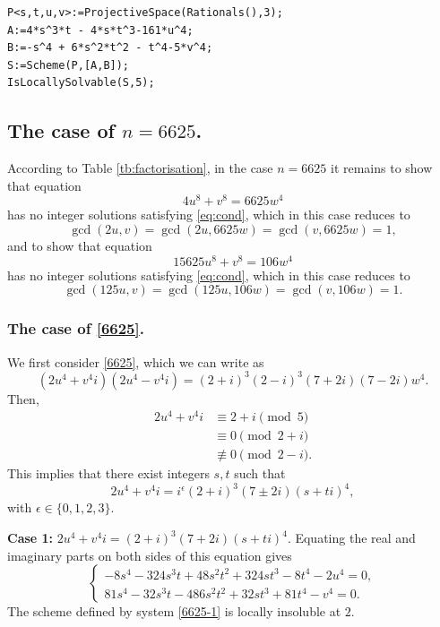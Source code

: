 \documentclass[a4paper,12pt,english,reqno]{amsart}
\begin{document}
\begin{lstlisting}
P<s,t,u,v>:=ProjectiveSpace(Rationals(),3);
A:=4*s^3*t - 4*s*t^3-161*u^4;
B:=-s^4 + 6*s^2*t^2 - t^4-5*v^4;
S:=Scheme(P,[A,B]);
IsLocallySolvable(S,5);
\end{lstlisting}


\subsection{The case of $n=6625$.}%
According to Table \ref{tb:factorisation}, in the case $n=6625$ it remains to
show that equation
\begin{equation}\label{6625}
4 u^8 + v^8 = 6625  w^4
\end{equation}
has no integer solutions satisfying \eqref{eq:cond}, which in this case reduces to \[\gcd(2u,v)=\gcd(2u,6625w)=\gcd(v,6625w)=1,\]
and to show that equation
\begin{equation}\label{6625.2}
15625 u^8 + v^8= 106  w^4
\end{equation}
has no integer solutions satisfying \eqref{eq:cond}, which in this case reduces to \[\gcd(125u,v)=\gcd(125u,106w)=\gcd(v,106w)=1.\]
 
 
 \subsubsection{\bf{The case of \eqref{6625}.}}
 We first consider \eqref{6625}, which we can write as
\begin{equation} (2u^4+v^4i)(2u^4-v^4i)=(2+i)^3(2-i)^3(7+2i)(7-2i)w^4.
\end{equation}
Then,
\[\begin{split}
    2u^4+v^4i&\equiv 2+i\pmod{5}\\
    &\equiv 0\pmod{2+i}\\
    &\not\equiv 0\pmod{2-i}.
\end{split}\]
This implies that there exist integers $s,t$ such that 
\[2u^4+v^4i=i^{\epsilon}(2+i)^3(7\pm 2i)(s+ti)^4,\]
with $\epsilon \in \{0,1,2,3\}$.

{\bf Case 1:} $2u^4+v^4i=(2+i)^3(7+2i)(s+ti)^4$. Equating the real and imaginary parts on both sides of this equation gives
\begin{equation}\label{6625-1}
\begin{cases}
-8s^4 - 324s^3t + 48s^2t^2 + 324st^3 - 8t^4 - 2u^4=0,\\
81s^4 - 32s^3t - 486s^2t^2 + 32st^3 + 81t^4 - v^4=0.
\end{cases}
\end{equation}
The scheme defined by system \eqref{6625-1} is locally insoluble at $2$.
\end{document}
